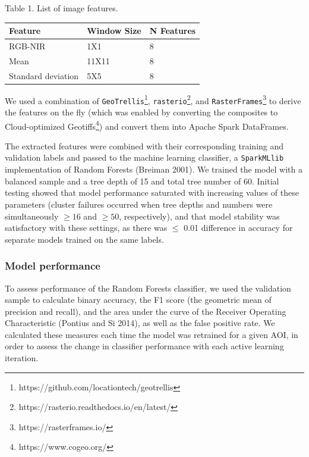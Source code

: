 \documentclass[11pt,a4paper]{article}
\begin{document}
\begin{center}Table 1. List of image features.\end{center}

\begin{longtable}[]{@{}lll@{}}
\toprule
Feature & Window Size & N Features \\
\midrule
\endhead
RGB-NIR & 1X1 & 8 \\
Mean & 11X11 & 8 \\
Standard deviation & 5X5 & 8 \\
\bottomrule
\end{longtable}

We used a combination of
\texttt{GeoTrellis}\footnote{https://github.com/locationtech/geotrellis},
\texttt{rasterio}\footnote{https://rasterio.readthedocs.io/en/latest/},
and \texttt{RasterFrames}\footnote{https://rasterframes.io/} to derive
the features on the fly (which was enabled by converting the composites
to Cloud-optimized Geotiffs\footnote{https://www.cogeo.org/}) and
convert them into Apache Spark DataFrames.

The extracted features were combined with their corresponding training
and validation labels and passed to the machine learning classifier, a
\texttt{SparkMLlib} implementation of Random Forests (Breiman 2001). We
trained the model with a balanced sample and a tree depth of 15 and
total tree number of 60. Initial testing showed that model performance
saturated with increasing values of these parameters (cluster failures
occurred when tree depths and numbers were simultaneously \(\geq16\) and
\(\geq50\), respectively), and that model stability was satisfactory
with these settings, as there was \(\leq\) 0.01 difference in accuracy
for separate models trained on the same labels.

\hypertarget{model-performance}{%
\subsubsection{Model performance}\label{model-performance}}

To assess performance of the Random Forests classifier, we used the
validation sample to calculate binary accuracy, the F1 score (the
geometric mean of precision and recall), and the area under the curve of
the Receiver Operating Characteristic (Pontius and Si 2014), as well as
the false positive rate. We calculated these measures each time the
model was retrained for a given AOI, in order to assess the change in
classifier performance with each active learning iteration.
\end{document}
